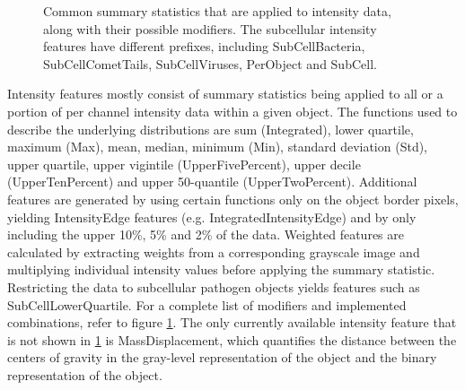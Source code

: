 \begin{figure}
\centering
  \caption[Intensity features and possible modifiers.]{Common summary statistics that are applied to intensity data, along with their possible modifiers. The subcellular intensity features have different prefixes, including SubCellBacteria, SubCellCometTails, SubCellViruses, PerObject and SubCell.}
  \label{fig:intensity-features}
\end{figure}

Intensity features mostly consist of summary statistics being applied to all or a portion of per channel intensity data within a given object. The functions used to describe the underlying distributions are sum (Integrated), lower quartile, maximum (Max), mean, median, minimum (Min), standard deviation (Std), upper quartile, upper vigintile (UpperFivePercent), upper decile (UpperTenPercent) and upper 50-quantile (UpperTwoPercent). Additional features are generated by using certain functions only on the object border pixels, yielding IntensityEdge features (e.g. IntegratedIntensityEdge) and by only including the upper 10\%, 5\% and 2\% of the data. Weighted features are calculated by extracting weights from a corresponding grayscale image and multiplying individual intensity values before applying the summary statistic. Restricting the data to subcellular pathogen objects yields features such as SubCellLowerQuartile. For a complete list of modifiers and implemented combinations, refer to figure \ref{fig:intensity-features}. The only currently available intensity feature that is not shown in \ref{fig:intensity-features} is MassDisplacement, which quantifies the distance between the centers of gravity in the gray-level representation of the object and the binary representation of the object.

